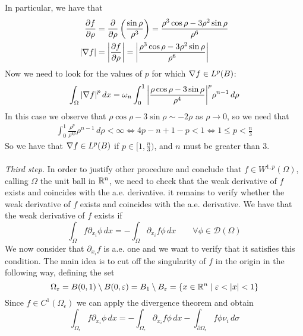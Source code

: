 In particular, we have that
\begin{align*}
\frac{\partial f}{\partial \rho} & = \frac{\partial }{\partial \rho}\left(\frac{\sin\rho}{\rho^3}\right) = \frac{\rho^3 \cos\rho  - 3  \rho^2 \sin\rho}{\rho^6}\\
\abs{\nabla f} & = \abs{\frac{\partial f}{\partial \rho}} = \abs{\frac{\rho^3 \cos\rho  - 3 \rho^2 \sin\rho }{\rho^6}}
\end{align*}
Now we need to look for the values of $p$ for which \(\nabla f \in L^p(B)\):
\begin{equation*}
\int_\Omega \abs{\nabla f}^p \, dx = \omega_n \int_0^1 \abs{\frac{\rho \cos\rho  - 3 \sin\rho }{\rho^4}}^p \rho^{n-1} \, d\rho \\
\end{equation*}
In this case we observe that $\rho \cos\rho  - 3 \sin\rho \sim -2\rho$ as $\rho \to 0$, so we need that
\[
    \begin{split}
        \int_0^1 \frac{\rho^p} {\rho^{4p}} \rho^{n-1} \, d\rho < \infty \iff 4p - n + 1 - p < 1 \iff 1 \leq p < \frac{n}{3}
    \end{split}
\]
So we have that \(\nabla f \in L^p(B)\) if \(p \in [1, \frac{n}{3})\), and $n$ must be greater than 3.\\
\vspace{0.1cm}\\
\textit{Third step.} In order to justify other procedure and conclude that $f \in W^{1,p}(\Omega)$, calling $\Omega$ the unit ball in $\mathbb{R}^n$, 
we need to check that the weak derivative of \(f\) exists and coincides with the a.e. derivative.
it remains to verify whether the weak derivative of \(f\) exists and coincides with the a.e. derivative.
We have that the weak derivative of \(f\) exists if
\begin{equation}\label{eq:weak_derivative}
\int_\Omega f \partial_{x_i} \phi \, dx = - \int_\Omega \partial_{x_i} f \phi \, dx \qquad \forall \phi \in \mathcal{D}(\Omega)
\end{equation}
We now consider that $\partial_{x_i} f$ is a.e. one and we want to verify that it satisfies this condition. 
The main idea is to cut off the singularity of \(f\) in the origin in the following way, defining the set
\[
    \Omega_\varepsilon = B(0, 1) \setminus B(0, \varepsilon) = B_1 \setminus B_\varepsilon = \left\{ x \in \mathbb{R}^n \mid \varepsilon < \abs{x} < 1 \right\}
\]
Since \(f \in C^1(\Omega_\epsilon)\) we can apply the divergence theorem and obtain
\begin{equation}\label{eq:divergence}
\int_{\Omega_\epsilon} f \partial_{x_i} \phi \, dx = -\int_{\Omega_\epsilon} \partial_{x_i} f \phi \, dx - \int_{\partial\Omega_\epsilon} f \phi \nu_i \, d\sigma
\end{equation}
